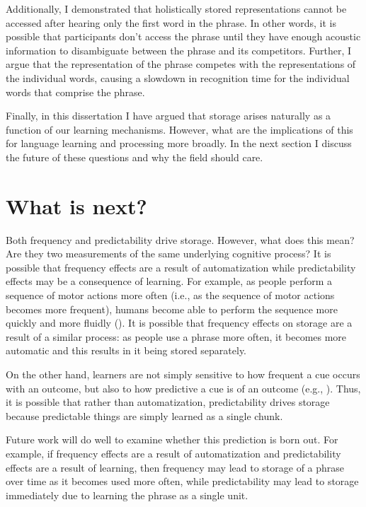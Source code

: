 \documentclass[
  12pt,
  letterpaper,
]{scrreprt}
\begin{document}
Additionally, I demonstrated that holistically stored representations
cannot be accessed after hearing only the first word in the phrase. In
other words, it is possible that participants don't access the phrase
until they have enough acoustic information to disambiguate between the
phrase and its competitors. Further, I argue that the representation of
the phrase competes with the representations of the individual words,
causing a slowdown in recognition time for the individual words that
comprise the phrase.

Finally, in this dissertation I have argued that storage arises
naturally as a function of our learning mechanisms. However, what are
the implications of this for language learning and processing more
broadly. In the next section I discuss the future of these questions and
why the field should care.

\section{What is next?}\label{what-is-next}

Both frequency and predictability drive storage. However, what does this
mean? Are they two measurements of the same underlying cognitive
process? It is possible that frequency effects are a result of
automatization while predictability effects may be a consequence of
learning. For example, as people perform a sequence of motor actions
more often (i.e., as the sequence of motor actions becomes more
frequent), humans become able to perform the sequence more quickly and
more fluidly (). It is possible that frequency effects on storage are a result of
a similar process: as people use a phrase more often, it becomes more
automatic and this results in it being stored separately.

On the other hand, learners are not simply sensitive to how frequent a
cue occurs with an outcome, but also to how predictive a cue is of an
outcome (e.g.,
). Thus, it is possible that rather than automatization,
predictability drives storage because predictable things are simply
learned as a single chunk.

Future work will do well to examine whether this prediction is born out.
For example, if frequency effects are a result of automatization and
predictability effects are a result of learning, then frequency may lead
to storage of a phrase over time as it becomes used more often, while
predictability may lead to storage immediately due to learning the
phrase as a single unit.
\end{document}
